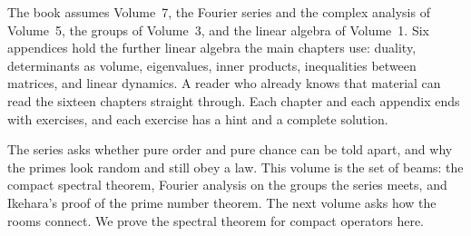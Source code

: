 The book assumes Volume~7, the Fourier series and the complex analysis of Volume~5, the groups of Volume~3, and the linear algebra of Volume~1. Six appendices hold the further linear algebra the main chapters use: duality, determinants as volume, eigenvalues, inner products, inequalities between matrices, and linear dynamics. A reader who already knows that material can read the sixteen chapters straight through. Each chapter and each appendix ends with exercises, and each exercise has a hint and a complete solution.

The series asks whether pure order and pure chance can be told apart, and why the primes look random and still obey a law. This volume is the set of beams: the compact spectral theorem, Fourier analysis on the groups the series meets, and Ikehara's proof of the prime number theorem. The next volume asks how the rooms connect. We prove the spectral theorem for compact operators here.
